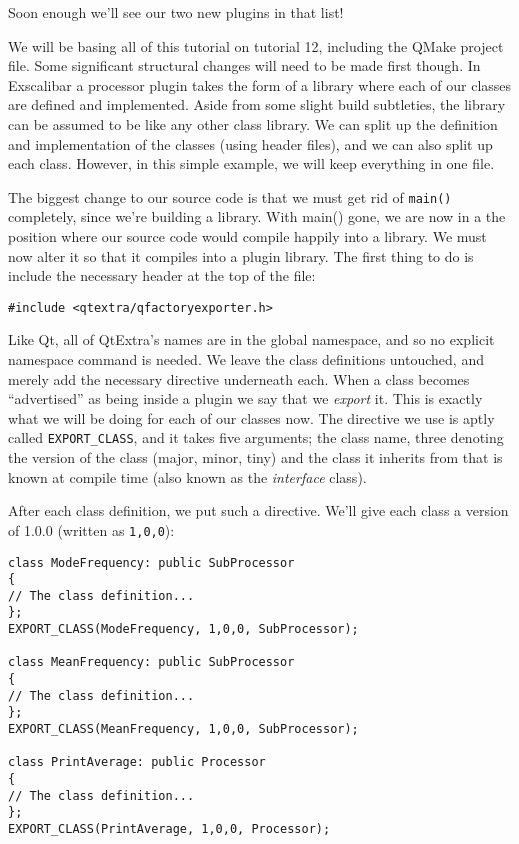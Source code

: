 Soon enough we'll see our two new plugins in that list!

We will be basing all of this tutorial on tutorial 12, including the QMake project file. Some significant structural changes will need to be made first though. In Exscalibar a processor plugin takes the form of a library where each of our classes are defined and implemented. Aside from some slight build subtleties, the library can be assumed to be like any other class library. We can split up the definition and implementation of the classes (using header files), and we can also split up each class. However, in this simple example, we will keep everything in one file.

The biggest change to our source code is that we must get rid of \texttt{main()} completely, since we're building a library. With main() gone, we are now in a the position where our source code would compile happily into a library. We must now alter it so that it compiles into a plugin library. The first thing to do is include the necessary header at the top of the file:

\begin{verbatim}
#include <qtextra/qfactoryexporter.h>
\end{verbatim}

Like Qt, all of QtExtra's names are in the global namespace, and so no explicit namespace command is needed. We leave the class definitions untouched, and merely add the necessary directive underneath each. When a class becomes ``advertised'' as being inside a plugin we say that we \textit{export} it. This is exactly what we will be doing for each of our classes now. The directive we use is aptly called \texttt{EXPORT\_CLASS}, and it takes five arguments; the class name, three denoting the version of the class (major, minor, tiny) and the class it inherits from that is known at compile time (also known as the \textit{interface} class).

After each class definition, we put such a directive. We'll give each class a version of 1.0.0 (written as \texttt{1,0,0}):

\begin{verbatim}
class ModeFrequency: public SubProcessor
{
// The class definition...
};
EXPORT_CLASS(ModeFrequency, 1,0,0, SubProcessor);

class MeanFrequency: public SubProcessor
{
// The class definition...
};
EXPORT_CLASS(MeanFrequency, 1,0,0, SubProcessor);

class PrintAverage: public Processor
{
// The class definition...
};
EXPORT_CLASS(PrintAverage, 1,0,0, Processor);
\end{verbatim}

